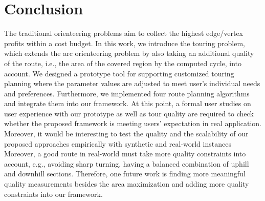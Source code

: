 \documentclass[sigconf,natbib=false]{acmart}
\begin{document}
\section{Conclusion}
The traditional orienteering problems aim to collect the highest edge/vertex profits within a cost budget.
In this work, we introduce the touring problem, which extends the arc orienteering problem by also taking an additional quality of the route, i.e., the area of the covered region by the computed cycle, into account.
We designed a prototype tool for supporting customized touring planning where the parameter values are adjusted to meet user's individual needs and preferences.
Furthermore, we implemented four route planning algorithms and integrate them into our framework.
At this point, a formal user studies on user experience with our prototype as well as tour quality are required to check whether the proposed framework is meeting users' expectation in real application. 
Moreover, it would be interesting to  test the quality and the scalability of our proposed approaches  empirically  with synthetic and real-world instances
Moreover, a good route in real-world must take more quality constraints into account, e.g., avoiding sharp turning,  having a balanced combination of uphill and downhill sections. 
Therefore, one future work is finding more meaningful quality measurements besides the area maximization and adding more quality constraints into our framework. 







\printbibliography
\end{document}
